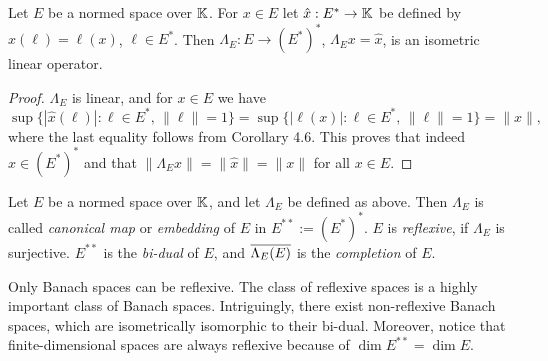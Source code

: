 \begin{lemma}
Let $E$ be a normed space over $\mathbb{K}$. For $x\in E$ let $\hat x : E^*\to\mathbb{K}$ be defined by $\hat x(\ell) = \ell(x)$, $\ell\in E^*$. Then $\Lambda_E : E\to (E^*)^*$, $\Lambda_Ex = \hat x$, is an isometric linear operator.
\end{lemma}
\begin{proof}
$\Lambda_E$ is linear, and for $x\in E$ we have
$$
\sup\{|\hat x(\ell)| : \ell\in E^*,\,\|\ell\|=1\} = \sup\{|\ell(x)| : \ell\in E^*,\,\|\ell\|=1\} = \|x\|,
$$
where the last equality follows from Corollary 4.6. This proves that indeed $\hat x\in (E^*)^*$ and that $\|\Lambda_E x\| = \|\hat x\| = \|x\|$ for all $x\in E$.
\end{proof}

\begin{definition}
Let $E$ be a normed space over $\mathbb{K}$, and let $\Lambda_E$ be defined as above. Then $\Lambda_E$ is called {\em canonical map} or {\em embedding} of $E$ in $E^{**} := (E^*)^*$. $E$ is {\em reflexive}, if $\Lambda_E$ is surjective. $E^{**}$ is the {\em bi-dual} of $E$, and $\overline{\Lambda_E(E)}$ is the {\em completion} of $E$.
\end{definition}

\begin{rem}
Only Banach spaces can be reflexive. The class of reflexive spaces is a highly important class of Banach spaces. Intriguingly, there exist non-reflexive Banach spaces, which are isometrically isomorphic to their bi-dual. Moreover, notice that finite-dimensional spaces are always reflexive because of $\dim E^{**} = \dim E$.
\end{rem}


